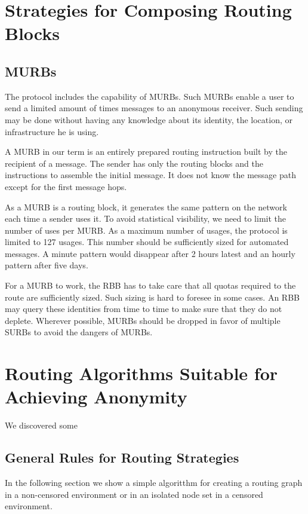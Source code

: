 \section{Strategies for Composing Routing Blocks}

\subsection{MURBs\label{sec:murb}}
The protocol includes the capability of MURBs. Such MURBs enable a user to send a limited amount of times messages to an anonymous receiver. Such sending may be done without having any knowledge about its identity, the location, or infrastructure he is using.

A MURB in our term is an entirely prepared routing instruction built by the recipient of a message. The sender has only the routing blocks and the instructions to assemble the initial message. It does not know the message path except for the first message hops.

As a MURB is a routing block, it generates the same pattern on the network each time a sender uses it. To avoid statistical visibility, we need to limit the number of uses per MURB. As a maximum number of usages, the protocol is limited to 127 usages. This number should be sufficiently sized for automated messages. A minute pattern would disappear after 2 hours latest and an hourly pattern after five days.

For a MURB to work, the RBB has to take care that all quotas required to the route are sufficiently sized. Such sizing is hard to foresee in some cases. An RBB may query these identities from time to time to make sure that they do not deplete. Wherever possible, MURBs should be dropped in favor of multiple SURBs to avoid the dangers of MURBs.

\section{Routing Algorithms Suitable for Achieving Anonymity\label{sec:routingStrategies}}
We discovered some 

\subsection{General Rules for Routing Strategies}

In the following section we show a simple algoritthm for creating a routing graph in a non-censored environment or in an isolated node set in a censored environment. 

